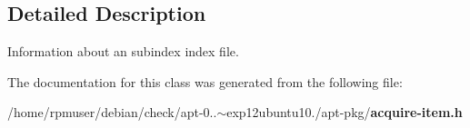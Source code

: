 \subsection{\-Detailed \-Description}
\-Information about an subindex index file. 

\-The documentation for this class was generated from the following file\-:\begin{DoxyCompactItemize}
\item 
/home/rpmuser/debian/check/apt-\/0..$\sim$exp12ubuntu10./apt-\/pkg/{\bf acquire-\/item.\-h}\end{DoxyCompactItemize}
